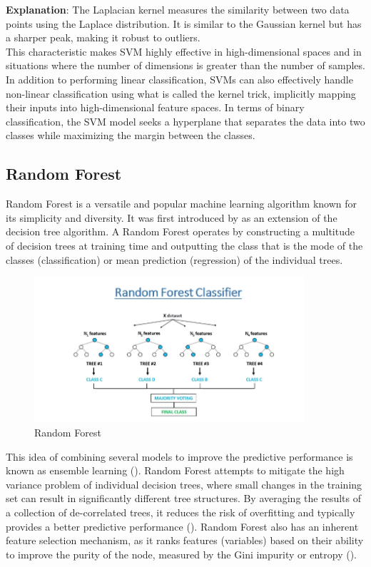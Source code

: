 \documentclass[12pt]{report}
\begin{document}
\textbf{Explanation}: The Laplacian kernel measures the similarity between two
data points using the Laplace distribution. It is similar to the Gaussian kernel
but has a sharper peak, making it robust to outliers.\\

This characteristic makes SVM highly effective in high-dimensional spaces and
in situations where the number of dimensions is greater than the number of
samples\cite{708428}. In addition to performing linear classification, SVMs
can also effectively handle non-linear classification using what is called the
kernel trick, implicitly mapping their inputs into high-dimensional feature
spaces\cite{10.1007/BFb0020217}. In terms of binary classification, the SVM
model seeks a hyperplane that separates the data into two classes while
maximizing the margin between the classes.

\newpage

\subsection*{Random Forest}
Random Forest is a versatile and popular machine learning algorithm known for
its simplicity and diversity. It was first introduced by\cite{Breiman2001} as
an extension of the decision tree algorithm. A Random Forest operates by
constructing a multitude of decision trees at training time and outputting the
class that is the mode of the classes (classification) or mean prediction
(regression) of the individual trees. \\

\begin{figure}[ht]
    \centering
    \includegraphics[width=10cm]{./figures/how-random-forest-classifier-work.png}
    \caption{Random Forest}\label{fig:fig2}
\end{figure}

This idea of combining several models to improve the predictive performance is
known as ensemble learning (\cite{Dietterich2000}). Random Forest attempts to
mitigate the high variance problem of individual decision trees, where small
changes in the training set can result in significantly different tree
structures. By averaging the results of a collection of de-correlated trees, it
reduces the risk of overfitting and typically provides a better predictive
performance (\cite{Sagi2018}). Random Forest also has an inherent feature
selection mechanism, as it ranks features (variables) based on their ability to
improve the purity of the node, measured by the Gini impurity or entropy
(\cite{DiazUriarte2006}).
\end{document}
